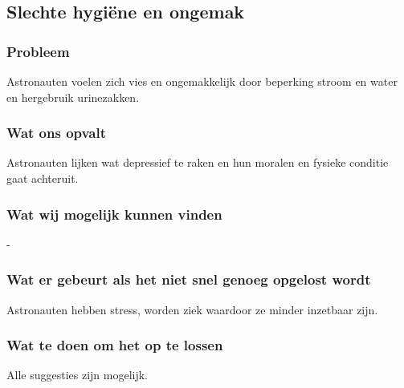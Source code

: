 \subsection{Slechte hygiëne en ongemak}

\subsubsection{Probleem}
Astronauten voelen zich vies en ongemakkelijk door beperking stroom en water en hergebruik urinezakken.

\subsubsection{Wat ons opvalt}
Astronauten lijken wat depressief te raken en hun moralen en fysieke conditie gaat achteruit.

\subsubsection{Wat wij mogelijk kunnen vinden}
-

\subsubsection{Wat er gebeurt als het niet snel genoeg opgelost wordt}
Astronauten hebben stress, worden ziek waardoor ze minder inzetbaar zijn.

\subsubsection{Wat te doen om het op te lossen}
Alle suggesties zijn mogelijk.